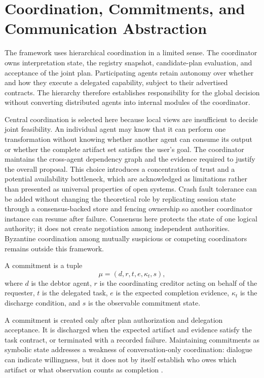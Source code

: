 \section{Coordination, Commitments, and Communication Abstraction}

The framework uses hierarchical coordination in a limited sense. The coordinator owns interpretation state, the registry snapshot, candidate-plan evaluation, and acceptance of the joint plan. Participating agents retain autonomy over whether and how they execute a delegated capability, subject to their advertised contracts. The hierarchy therefore establishes responsibility for the global decision without converting distributed agents into internal modules of the coordinator.

Central coordination is selected here because local views are insufficient to decide joint feasibility. An individual agent may know that it can perform one transformation without knowing whether another agent can consume its output or whether the complete artifact set satisfies the user's goal. The coordinator maintains the cross-agent dependency graph and the evidence required to justify the overall proposal. This choice introduces a concentration of trust and a potential availability bottleneck, which are acknowledged as limitations rather than presented as universal properties of open systems. Crash fault tolerance can be added without changing the theoretical role by replicating session state through a consensus-backed store and fencing ownership so another coordinator instance can resume after failure. Consensus here protects the state of one logical authority; it does not create negotiation among independent authorities. Byzantine coordination among mutually suspicious or competing coordinators remains outside this framework.

\begin{definition}[Commitment]
\label{def:commitment}
A commitment is a tuple
\[
\mu = (d, r, t, e, \kappa_t, s),
\]
where $d$ is the debtor agent, $r$ is the coordinating creditor acting on behalf of the requester, $t$ is the delegated task, $e$ is the expected completion evidence, $\kappa_t$ is the discharge condition, and $s$ is the observable commitment state.
\end{definition}

A commitment is created only after plan authorization and delegation acceptance. It is discharged when the expected artifact and evidence satisfy the task contract, or terminated with a recorded failure. Maintaining commitments as symbolic state addresses a weakness of conversation-only coordination: dialogue can indicate willingness, but it does not by itself establish who owes which artifact or what observation counts as completion \cite{singh1999commitments}.


